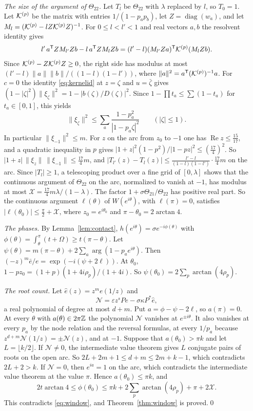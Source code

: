 \emph{The size of the argument of $\Theta_{22}$.} Let $T_l$ be $\Theta_{22}$ with $\lambda$ replaced by $l$, so
$T_0=1$. Let $\mathcal K^{(p)}$ be the matrix with entries $1/(1-p_ap_b)$, let $Z=\operatorname{diag}(w_a)$, and let
$M_l=(\mathcal K^{(p)}-lZ\mathcal K^{(p)}Z)^{-1}$. For $0\le l<l'<1$ and real vectors $a,b$ the resolvent identity gives
\[
 l'\,a^{\mathsf T}ZM_{l'}Zb-l\,a^{\mathsf T}ZM_lZb=(l'-l)(M_{l'}Za)^{\mathsf T}\mathcal K^{(p)}(M_lZb) .
\]
Since $\mathcal K^{(p)}-Z\mathcal K^{(p)}Z\ge0$, the right side has modulus at most $(l'-l)\|a\|\|b\|/((1-l)(1-l'))$, where
$\|a\|^2=a^{\mathsf T}(\mathcal K^{(p)})^{-1}a$. For $c=0$ the identity \eqref{eq:kernelid} at $z=\zeta$ and $u=\bar\zeta$ gives
$(1-|\zeta|^2)\|\xi_\zeta\|^2=1-|b(\zeta)/D(\zeta)|^2$. Since $1-\prod t_a\le\sum(1-t_a)$ for $t_a\in[0,1]$, this yields
\[
 \|\xi_\zeta\|^2\le\sum_a\frac{1-p_a^2}{|1-p_a\zeta|^2}\qquad(|\zeta|\le1).
\]
In particular $\|\xi_{-1}\|^2\le m$. For $z$ on the arc from $z_0$ to $-1$ one has $\operatorname{Re}z\le\frac{15}{17}$,
and a quadratic inequality in $p$ gives $|1+z|^2(1-p^2)/|1-pz|^2\le(\frac{17}4)^2$. So
$|1+z|\,\|\xi_z\|\,\|\xi_{-1}\|\le\frac{17}4m$, and
$|T_{l'}(z)-T_l(z)|\le\frac{l'-l}{(1-l)(1-l')}\cdot\frac{17}4m$ on the arc. Since $|T_l|\ge1$, a telescoping product
over a fine grid of $[0,\lambda]$ shows that the continuous argument of $\Theta_{22}$ on the arc, normalized to vanish
at $-1$, has modulus at most $\mathcal X=\frac{17}4m\lambda/(1-\lambda)$. The factor $1+\sigma\Theta_{21}/\Theta_{22}$ has
positive real part. So the continuous argument $\ell(\theta)$ of $W(e^{i\theta})$, with $\ell(\pi)=0$, satisfies
$|\ell(\theta_0)|\le\frac\pi2+\mathcal X$, where $z_0=e^{i\theta_0}$ and $\pi-\theta_0=2\arctan4$.

\emph{The phases.} By Lemma~\ref{lem:contact}, $h(e^{i\theta})=\sigma e^{-i\phi(\theta)}$ with
$\phi(\theta)=\int_\theta^\pi(t+\Omega)\ge t(\pi-\theta)$. Let
$\psi(\theta)=m(\pi-\theta)+2\sum_a\arg(1-p_ae^{i\theta})$. Then $(-z)^m\bar e/e=\exp(-i(\psi+2\ell))$. At $\theta_0$,
$1-pz_0=(1+p)(1+4i\rho_p)/(1+4i)$. So $\psi(\theta_0)=2\sum_p\arctan(4\rho_p)$.

\emph{The root count.} Let $\hat e(z)=z^me(1/z)$ and
\[
 \mathcal N=\varepsilon z^sPe-\sigma\kappa P^*\hat e,
\]
a real polynomial of degree at most $d+m$. Put $a=\phi-\psi-2\ell$, so $a(\pi)=0$. At every $\theta$ with
$a(\theta)\in2\pi\mathbb Z$ the polynomial $\mathcal N$ vanishes at $e^{\pm i\theta}$. It also vanishes at every $p_a$ by the
node relation and the reversal formulas, at every $1/p_a$ because $z^{d+m}\mathcal N(1/z)=\pm\mathcal N(z)$, and at $-1$. Suppose
that $a(\theta_0)>\pi k$ and let $L=\lfloor k/2\rfloor$. If $\mathcal N\ne0$, the intermediate value theorem gives $L$
conjugate pairs of roots on the open arc. So $2L+2m+1\le d+m\le2m+k-1$, which contradicts $2L+2>k$. If
$\mathcal N=0$, then $e^{ia}=1$ on the arc, which contradicts the intermediate value theorem at the value $\pi$.
Hence $a(\theta_0)\le\pi k$, and
\[
 2t\arctan4\le\phi(\theta_0)\le\pi k+2\sum_p\arctan(4\rho_p)+\pi+2\mathcal X .
\]
This contradicts \eqref{eq:window}, and Theorem~\ref{thm:window} is proved.\qed

